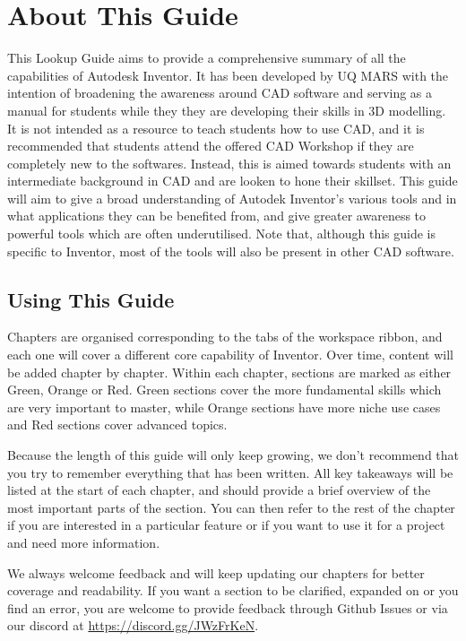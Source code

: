\chapter{About This Guide}

This Lookup Guide aims to provide a comprehensive summary of all the capabilities of Autodesk Inventor. It has been developed by UQ MARS with the intention of broadening the awareness around CAD software and serving as a manual for students while they they are developing their skills in 3D modelling. It is not intended as a resource to teach students how to use CAD, and it is recommended that students attend the offered CAD Workshop if they are completely new to the softwares. Instead, this is aimed towards students with an intermediate background in CAD and are looken to hone their skillset. This guide will aim to give a broad understanding of Autodek Inventor's various tools and in what applications they can be benefited from, and give greater awareness to powerful tools which are often underutilised. Note that, although this guide is specific to Inventor, most of the tools will also be present in other CAD software.

\section{Using This Guide}
Chapters are organised corresponding to the tabs of the workspace ribbon, and each one will cover a different core capability of Inventor. Over time, content will be added chapter by chapter.
Within each chapter, sections are marked as either Green, Orange or Red. Green sections cover the more fundamental skills which are very important to master, while Orange sections have more niche use cases and Red sections cover advanced topics.

Because the length of this guide will only keep growing, we don't recommend that you try to remember everything that has been written. All key takeaways will be listed at the start of each chapter, and should provide a brief overview of the most important parts of the section. You can then refer to the rest of the chapter if you are interested in a particular feature or if you want to use it for a project and need more information.

We always welcome feedback and will keep updating our chapters for better coverage and readability. If you want a section to be clarified, expanded on or you find an error, you are welcome to provide feedback through Github Issues or via our discord at \url{https://discord.gg/JWzFrKeN}.
